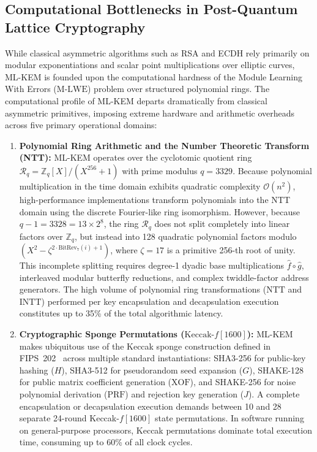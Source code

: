 \subsection{Computational Bottlenecks in Post-Quantum Lattice Cryptography}
\label{sec:intro_bottlenecks}
While classical asymmetric algorithms such as RSA and ECDH rely primarily on modular exponentiations and scalar point multiplications over elliptic curves, ML-KEM is founded upon the computational hardness of the Module Learning With Errors ($\text{M-LWE}$) problem over structured polynomial rings. The computational profile of ML-KEM departs dramatically from classical asymmetric primitives, imposing extreme hardware and arithmetic overheads across five primary operational domains:

\begin{enumerate}
    \item \textbf{Polynomial Ring Arithmetic and the Number Theoretic Transform (NTT):}
    ML-KEM operates over the cyclotomic quotient ring $\mathcal{R}_q = \mathbb{Z}_q[X] / (X^{256} + 1)$ with prime modulus $q = 3329$. Because polynomial multiplication in the time domain exhibits quadratic complexity $\mathcal{O}(n^2)$, high-performance implementations transform polynomials into the NTT domain using the discrete Fourier-like ring isomorphism. However, because $q - 1 = 3328 = 13 \times 2^8$, the ring $\mathcal{R}_q$ does not split completely into linear factors over $\mathbb{Z}_q$, but instead into 128 quadratic polynomial factors modulo $(X^2 - \zeta^{2\cdot\text{BitRev}_7(i) + 1})$, where $\zeta = 17$ is a primitive 256-th root of unity. This incomplete splitting requires degree-1 dyadic base multiplications $\hat{f} \circ \hat{g}$, interleaved modular butterfly reductions, and complex twiddle-factor address generators. The high volume of polynomial ring transformations ($\text{NTT}$ and $\text{INTT}$) performed per key encapsulation and decapsulation execution constitutes up to 35\% of the total algorithmic latency.

    \item \textbf{Cryptographic Sponge Permutations ($\text{Keccak-}f[1600]$):}
    ML-KEM makes ubiquitous use of the Keccak sponge construction defined in FIPS~202~\cite{fips202} across multiple standard instantiations: SHA3-256 for public-key hashing ($H$), SHA3-512 for pseudorandom seed expansion ($G$), SHAKE-128 for public matrix coefficient generation ($\text{XOF}$), and SHAKE-256 for noise polynomial derivation ($\text{PRF}$) and rejection key generation ($J$). A complete encapsulation or decapsulation execution demands between 10 and 28 separate 24-round Keccak-$f[1600]$ state permutations. In software running on general-purpose processors, Keccak permutations dominate total execution time, consuming up to 60\% of all clock cycles.


\end{enumerate}
